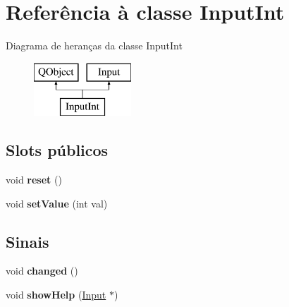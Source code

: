 \hypertarget{class_input_int}{\section{Referência à classe Input\-Int}
\label{class_input_int}
}
Diagrama de heranças da classe Input\-Int\begin{figure}[H]
\begin{center}
\leavevmode
\includegraphics[height=2.000000cm]{class_input_int}
\end{center}
\end{figure}
\subsection*{Slots públicos}
\begin{DoxyCompactItemize}
\item 
\hypertarget{class_input_int_ad20897c5c8bd47f5d4005989bead0e55}{void {\bfseries reset} ()}\label{class_input_int_ad20897c5c8bd47f5d4005989bead0e55}

\item 
\hypertarget{class_input_int_ac050679e5c1c866f6491e283584699b3}{void {\bfseries set\-Value} (int val)}\label{class_input_int_ac050679e5c1c866f6491e283584699b3}

\end{DoxyCompactItemize}
\subsection*{Sinais}
\begin{DoxyCompactItemize}
\item 
\hypertarget{class_input_int_a5d42414aede4a6105b6956c0aca81fa0}{void {\bfseries changed} ()}\label{class_input_int_a5d42414aede4a6105b6956c0aca81fa0}

\item 
\hypertarget{class_input_int_af32333a92f81f1f8570f1ddc0e5443d5}{void {\bfseries show\-Help} (\hyperlink{class_input}{Input} $\ast$)}\label{class_input_int_af32333a92f81f1f8570f1ddc0e5443d5}

\end{DoxyCompactItemize}
